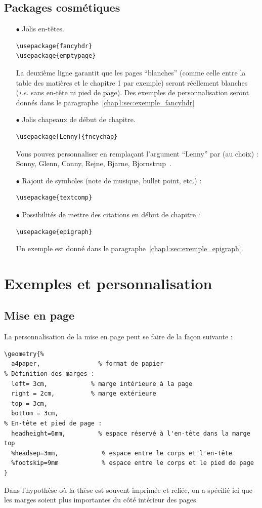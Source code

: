 \subsection{Packages cosmétiques}
\begin{itemize}
\item[$\bullet$] Jolis en-têtes.
\begin{verbatim}
\usepackage{fancyhdr}
\usepackage{emptypage}
\end{verbatim}
La deuxième ligne garantit que les pages ``blanches'' (comme celle entre la table des matières et le chapitre 1 par exemple) seront réellement blanches (\textit{i.e.} sans en-tête ni pied de page). Des exemples de personnalisation seront donnés dans le paragraphe~\ref{chap1:sec:exemple_fancyhdr}
\item[$\bullet$] Jolis chapeaux de début de chapitre.
\begin{verbatim}
\usepackage[Lenny]{fncychap}
\end{verbatim}
Vous pouvez personnaliser en remplaçant l'argument ``Lenny'' par (au choix) : Sonny, Glenn, Conny, Rejne, Bjarne, Bjornstrup~\cite{fncychap}.
\item[$\bullet$] Rajout de symboles (note de musique, bullet point, etc.) :
\begin{verbatim}
\usepackage{textcomp}
\end{verbatim}
\item[$\bullet$] Possibilités de mettre des citations en début de chapitre :
\begin{verbatim}
\usepackage{epigraph}
\end{verbatim}
Un exemple est donné dans le paragraphe~\ref{chap1:sec:exemple_epigraph}.
\end{itemize}


\section{Exemples et personnalisation}

\subsection{Mise en page}
\label{chap1:sec:exemple_geometry}
La personnalisation de la mise en page peut se faire de la façon suivante :
{\small \begin{verbatim}
\geometry{%
  a4paper,                % format de papier
% Définition des marges :
  left= 3cm,            % marge intérieure à la page
  right = 2cm,          % marge extérieure
  top = 3cm,
  bottom = 3cm,
% En-tête et pied de page :
  headheight=6mm,         % espace réservé à l'en-tête dans la marge top
  %headsep=3mm,            % espace entre le corps et l'en-tête
  %footskip=9mm            % espace entre le corps et le pied de page
}
\end{verbatim}}
\noindent Dans l'hypothèse où la thèse est souvent imprimée et reliée, on a spécifié ici que les marges soient plus importantes du côté intérieur des pages.

